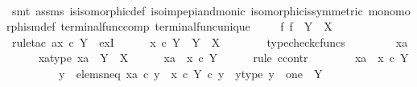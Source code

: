 \begin{isabellebody}
\ \ \ \ \isamarkupfalse%
\ {\isacharparenleft}{\kern0pt}smt\ assms\ is{\isacharunderscore}{\kern0pt}isomorphic{\isacharunderscore}{\kern0pt}def\ iso{\isacharunderscore}{\kern0pt}imp{\isacharunderscore}{\kern0pt}epi{\isacharunderscore}{\kern0pt}and{\isacharunderscore}{\kern0pt}monic\ isomorphic{\isacharunderscore}{\kern0pt}is{\isacharunderscore}{\kern0pt}symmetric\ monomorphism{\isacharunderscore}{\kern0pt}def{}\ terminal{\isacharunderscore}{\kern0pt}func{\isacharunderscore}{\kern0pt}comp\ terminal{\isacharunderscore}{\kern0pt}func{\isacharunderscore}{\kern0pt}unique{\isacharparenright}{\kern0pt}\isanewline
\ \ \isamarkupfalse%
\ \ {\isachardoublequoteopen}{\isasymexists}{\isacharbang}{\kern0pt}f{\isachardot}{\kern0pt}\ f\ {\isacharcolon}{\kern0pt}\ Y\ {\isasymrightarrow}\ X{\isachardoublequoteclose}\isanewline
\ \ \isamarkupfalse%
\ {\isacharparenleft}{\kern0pt}rule{\isacharunderscore}{\kern0pt}tac\ a{\isacharequal}{\kern0pt}{\isachardoublequoteopen}x\ {\isasymcirc}\isactrlsub c\ {\isasymbeta}\isactrlbsub Y\isactrlesub {\isachardoublequoteclose}\ \ ex{}I{\isacharparenright}{\kern0pt}\isanewline
\ \ \ \ \isamarkupfalse%
\ {\isachardoublequoteopen}x\ {\isasymcirc}\isactrlsub c\ {\isasymbeta}\isactrlbsub Y\isactrlesub \ {\isacharcolon}{\kern0pt}\ Y\ {\isasymrightarrow}\ X{\isachardoublequoteclose}\isanewline
\ \ \ \ \ \ \isamarkupfalse%
\ typecheck{\isacharunderscore}{\kern0pt}cfuncs\isanewline
\ \ \isamarkupfalse%
\isanewline
\ \ \ \ \isamarkupfalse%
\ xa\isanewline
\ \ \ \ \isamarkupfalse%
\ xa{\isacharunderscore}{\kern0pt}type{\isacharcolon}{\kern0pt}\ {\isachardoublequoteopen}xa\ {\isacharcolon}{\kern0pt}\ Y\ {\isasymrightarrow}\ X{\isachardoublequoteclose}\isanewline
\ \ \ \ \isamarkupfalse%
\ {\isachardoublequoteopen}xa\ {\isacharequal}{\kern0pt}\ x\ {\isasymcirc}\isactrlsub c\ {\isasymbeta}\isactrlbsub Y\isactrlesub {\isachardoublequoteclose}\isanewline
\ \ \ \ \isamarkupfalse%
\ {\isacharparenleft}{\kern0pt}rule\ ccontr{\isacharparenright}{\kern0pt}\isanewline
\ \ \ \ \ \ \isamarkupfalse%
\ {\isachardoublequoteopen}xa\ {\isasymnoteq}\ x\ {\isasymcirc}\isactrlsub c\ {\isasymbeta}\isactrlbsub Y\isactrlesub {\isachardoublequoteclose}\isanewline
\ \ \ \ \ \ \isamarkupfalse%
\ \isamarkupfalse%
\ y\ \ elems{\isacharunderscore}{\kern0pt}neq{\isacharcolon}{\kern0pt}\ {\isachardoublequoteopen}xa\ {\isasymcirc}\isactrlsub c\ y\ {\isasymnoteq}\ {\isacharparenleft}{\kern0pt}x\ {\isasymcirc}\isactrlsub c\ {\isasymbeta}\isactrlbsub Y\isactrlesub {\isacharparenright}{\kern0pt}\ {\isasymcirc}\isactrlsub c\ y{\isachardoublequoteclose}\ \ y{\isacharunderscore}{\kern0pt}type{\isacharcolon}{\kern0pt}\ {\isachardoublequoteopen}y\ {\isacharcolon}{\kern0pt}\ one\ {\isasymrightarrow}\ Y{\isachardoublequoteclose}\isanewline

\end{isabellebody}
